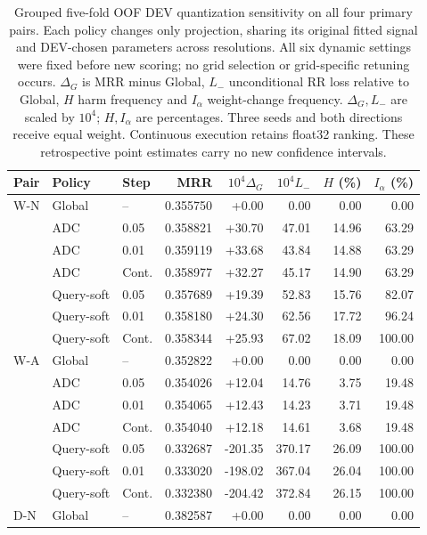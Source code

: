 \begin{table}[htbp]
\centering\footnotesize\setlength{\tabcolsep}{4pt}
\caption{Grouped five-fold OOF DEV quantization sensitivity on all four primary pairs. Each policy changes only projection, sharing its original fitted signal and DEV-chosen parameters across resolutions. All six dynamic settings were fixed before new scoring; no grid selection or grid-specific retuning occurs. $\Delta_G$ is MRR minus Global, $L_-$ unconditional RR loss relative to Global, $H$ harm frequency and $I_\alpha$ weight-change frequency. $\Delta_G,L_-$ are scaled by $10^4$; $H,I_\alpha$ are percentages. Three seeds and both directions receive equal weight. Continuous execution retains float32 ranking. These retrospective point estimates carry no new confidence intervals.}
\label{tab:grid-dev}
\begin{tabular}{lllrrrrr}
\toprule
Pair & Policy & Step & MRR & $10^4\Delta_G$ & $10^4L_-$ & $H$ (\%) & $I_\alpha$ (\%)\\
\midrule
W-N & Global & -- & 0.355750 & +0.00 & 0.00 & 0.00 & 0.00\\
 & ADC & 0.05 & 0.358821 & +30.70 & 47.01 & 14.96 & 63.29\\
 & ADC & 0.01 & 0.359119 & +33.68 & 43.84 & 14.88 & 63.29\\
 & ADC & Cont. & 0.358977 & +32.27 & 45.17 & 14.90 & 63.29\\
 & Query-soft & 0.05 & 0.357689 & +19.39 & 52.83 & 15.76 & 82.07\\
 & Query-soft & 0.01 & 0.358180 & +24.30 & 62.56 & 17.72 & 96.24\\
 & Query-soft & Cont. & 0.358344 & +25.93 & 67.02 & 18.09 & 100.00\\
\midrule
W-A & Global & -- & 0.352822 & +0.00 & 0.00 & 0.00 & 0.00\\
 & ADC & 0.05 & 0.354026 & +12.04 & 14.76 & 3.75 & 19.48\\
 & ADC & 0.01 & 0.354065 & +12.43 & 14.23 & 3.71 & 19.48\\
 & ADC & Cont. & 0.354040 & +12.18 & 14.61 & 3.68 & 19.48\\
 & Query-soft & 0.05 & 0.332687 & -201.35 & 370.17 & 26.09 & 100.00\\
 & Query-soft & 0.01 & 0.333020 & -198.02 & 367.04 & 26.04 & 100.00\\
 & Query-soft & Cont. & 0.332380 & -204.42 & 372.84 & 26.15 & 100.00\\
\midrule
D-N & Global & -- & 0.382587 & +0.00 & 0.00 & 0.00 & 0.00\\

\end{tabular}
\end{table}
